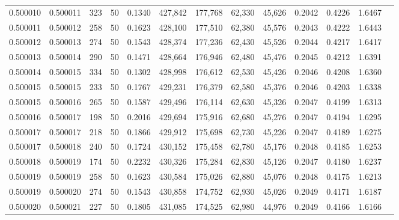 \begin{tabular}{rrrrrrrrrrrrr}
0.500010 & 0.500011 & 323 &  50 &                                     0.1340 & 427,842 & 177,768 &  62,330 &  45,626 & 0.2042 & 0.4226 & 1.6467 \\
0.500011 & 0.500012 & 258 &  50 &                                     0.1623 & 428,100 & 177,510 &  62,380 &  45,576 & 0.2043 & 0.4222 & 1.6443 \\
0.500012 & 0.500013 & 274 &  50 &                                     0.1543 & 428,374 & 177,236 &  62,430 &  45,526 & 0.2044 & 0.4217 & 1.6417 \\
0.500013 & 0.500014 & 290 &  50 &                                     0.1471 & 428,664 & 176,946 &  62,480 &  45,476 & 0.2045 & 0.4212 & 1.6391 \\
0.500014 & 0.500015 & 334 &  50 &                                     0.1302 & 428,998 & 176,612 &  62,530 &  45,426 & 0.2046 & 0.4208 & 1.6360 \\
0.500015 & 0.500015 & 233 &  50 &                                     0.1767 & 429,231 & 176,379 &  62,580 &  45,376 & 0.2046 & 0.4203 & 1.6338 \\
0.500015 & 0.500016 & 265 &  50 &                                     0.1587 & 429,496 & 176,114 &  62,630 &  45,326 & 0.2047 & 0.4199 & 1.6313 \\
0.500016 & 0.500017 & 198 &  50 &                                     0.2016 & 429,694 & 175,916 &  62,680 &  45,276 & 0.2047 & 0.4194 & 1.6295 \\
0.500017 & 0.500017 & 218 &  50 &                                     0.1866 & 429,912 & 175,698 &  62,730 &  45,226 & 0.2047 & 0.4189 & 1.6275 \\
0.500017 & 0.500018 & 240 &  50 &                                     0.1724 & 430,152 & 175,458 &  62,780 &  45,176 & 0.2048 & 0.4185 & 1.6253 \\
0.500018 & 0.500019 & 174 &  50 &                                     0.2232 & 430,326 & 175,284 &  62,830 &  45,126 & 0.2047 & 0.4180 & 1.6237 \\
0.500019 & 0.500019 & 258 &  50 &                                     0.1623 & 430,584 & 175,026 &  62,880 &  45,076 & 0.2048 & 0.4175 & 1.6213 \\
0.500019 & 0.500020 & 274 &  50 &                                     0.1543 & 430,858 & 174,752 &  62,930 &  45,026 & 0.2049 & 0.4171 & 1.6187 \\
0.500020 & 0.500021 & 227 &  50 &                                     0.1805 & 431,085 & 174,525 &  62,980 &  44,976 & 0.2049 & 0.4166 & 1.6166 \\

\end{tabular}
